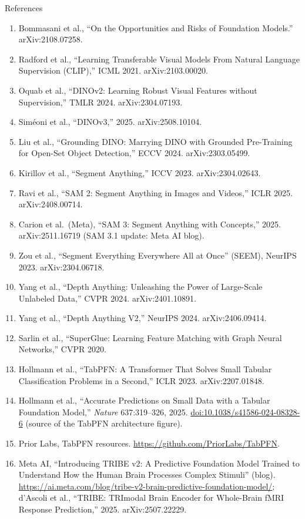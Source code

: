 \begin{frame}[allowframebreaks]{References}
  \footnotesize
  \begin{enumerate}\itemsep0.08em
    \item Bommasani et al., ``On the Opportunities and Risks of Foundation Models.'' arXiv:2108.07258.
    \item Radford et al., ``Learning Transferable Visual Models From Natural Language Supervision (CLIP),'' ICML 2021. arXiv:2103.00020.
    \item Oquab et al., ``DINOv2: Learning Robust Visual Features without Supervision,'' TMLR 2024. arXiv:2304.07193.
    \item Sim\'eoni et al., ``DINOv3,'' 2025. arXiv:2508.10104.
    \item Liu et al., ``Grounding DINO: Marrying DINO with Grounded Pre-Training for Open-Set Object Detection,'' ECCV 2024. arXiv:2303.05499.
    \item Kirillov et al., ``Segment Anything,'' ICCV 2023. arXiv:2304.02643.
    \item Ravi et al., ``SAM 2: Segment Anything in Images and Videos,'' ICLR 2025. arXiv:2408.00714.
    \item Carion et al.\ (Meta), ``SAM 3: Segment Anything with Concepts,'' 2025. arXiv:2511.16719 (SAM 3.1 update: Meta AI blog).
    \item Zou et al., ``Segment Everything Everywhere All at Once'' (SEEM), NeurIPS 2023. arXiv:2304.06718.
    \item Yang et al., ``Depth Anything: Unleashing the Power of Large-Scale Unlabeled Data,'' CVPR 2024. arXiv:2401.10891.
    \item Yang et al., ``Depth Anything V2,'' NeurIPS 2024. arXiv:2406.09414.
    \item Sarlin et al., ``SuperGlue: Learning Feature Matching with Graph Neural Networks,'' CVPR 2020.
    \item Hollmann et al., ``TabPFN: A Transformer That Solves Small Tabular Classification Problems in a Second,'' ICLR 2023. arXiv:2207.01848.
    \item Hollmann et al., ``Accurate Predictions on Small Data with a Tabular Foundation Model,'' \emph{Nature} 637:319--326, 2025. \href{https://doi.org/10.1038/s41586-024-08328-6}{doi:10.1038/s41586-024-08328-6} (source of the TabPFN architecture figure).
    \item Prior Labs, TabPFN resources. \url{https://github.com/PriorLabs/TabPFN}.
    \item Meta AI, ``Introducing TRIBE v2: A Predictive Foundation Model Trained to Understand How the Human Brain Processes Complex Stimuli'' (blog). \url{https://ai.meta.com/blog/tribe-v2-brain-predictive-foundation-model/}; d'Ascoli et al., ``TRIBE: TRImodal Brain Encoder for Whole-Brain fMRI Response Prediction,'' 2025. arXiv:2507.22229.

\end{enumerate}
\end{frame}
